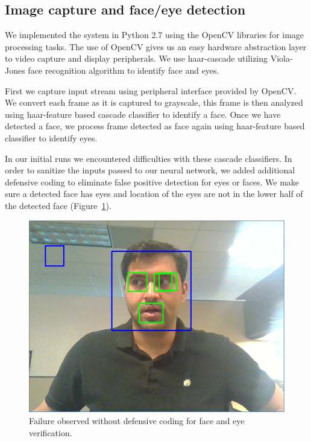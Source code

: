 \documentclass[10pt,twocolumn,letterpaper]{article}
\begin{document}
\subsection{Image capture and face/eye detection}
We implemented the system in Python 2.7 using the OpenCV libraries for 
image processing tasks. The use of OpenCV gives us an easy hardware 
abstraction layer to video capture and display peripherals. We use 
haar-cascade utilizing Viola-Jones face recognition algorithm to 
identify face and eyes. 

First we capture input stream using peripheral
interface provided by OpenCV. We convert each 
frame as it is captured to grayscale, this frame is then analyzed 
using haar-feature based cascade classifier to identify a face. 
Once we have detected a face, we process frame detected 
as face again using haar-feature based classifier to identify eyes. 

In our initial runs we encountered difficulties with these cascade classifiers. 
In order to sanitize the inputs passed to our neural network, we added 
additional defensive coding to eliminate false positive detection 
for eyes or faces. We make sure a detected face has eyes 
and location of the eyes are not in the lower half of the detected face
 (Figure~\ref{fig:defensive}).

\begin{figure}
  \begin{center}
    \includegraphics[width=\linewidth]{defensive_coding_example}
  \end{center}
  \caption{Failure observed without defensive coding for face and eye
    verification.}
  \label{fig:defensive}
\end{figure}
\end{document}
